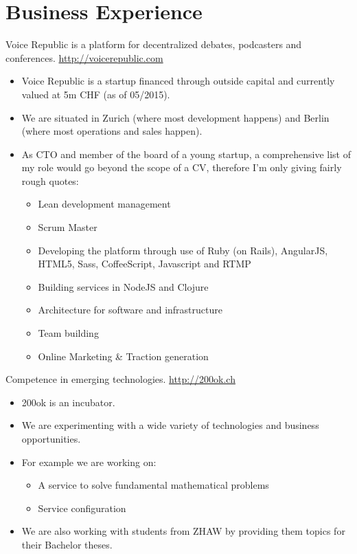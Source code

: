 \documentclass[10pt,a4paper]{moderncv}
\begin{document}
\maketitle

\section{Business Experience}
{Voice Republic is a platform for decentralized debates, podcasters and conferences.
\newline
\url{http://voicerepublic.com}
\newline
\begin{itemize}
  \item Voice Republic is a startup financed through outside capital and
  currently valued at 5m CHF (as of 05/2015).
  \item We are situated in Zurich (where most development happens) and Berlin
  (where most operations and sales happen).
  \item As CTO and member of the board of a young startup, a comprehensive list
  of my role would go beyond the scope of a CV, therefore I'm only giving
  fairly rough quotes:
  \begin{itemize}
    \item Lean development management
    \item Scrum Master
    \item Developing the platform through use of Ruby (on Rails), AngularJS,
    HTML5, Sass, CoffeeScript, Javascript and RTMP
    \item Building services in NodeJS and Clojure
    \item Architecture for software and infrastructure
    \item Team building
    \item Online Marketing \& Traction generation
  \end{itemize}
\end{itemize}}

{Competence in emerging technologies.
\newline
\url{http://200ok.ch}
\newline
\begin{itemize}
  \item 200ok is an incubator.
  \item We are experimenting with a wide variety of technologies and business
  opportunities.
  \item For example we are working on:
  \begin{itemize}
    \item A service to solve fundamental mathematical problems
    \item Service configuration
  \end{itemize}
  \item We are also working with students from ZHAW by providing them topics
  for their Bachelor theses.
\end{itemize}}
\end{document}
